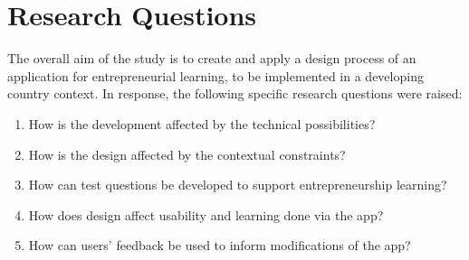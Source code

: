 \section{Research Questions}\label{sec:research-questions}

The overall aim of the study is to create and apply a design process of an application for entrepreneurial learning, to be implemented in a developing country context. In response, the following specific research questions were raised:

\begin{enumerate}
    \item How is the development affected by the technical possibilities?

    \item How is the design affected by the contextual  constraints? %


    \item How can test questions be developed to support entrepreneurship learning? %

    \item How does design affect usability and learning done via the app? %

    \item How can users' feedback be used to inform modifications of the app?

\end{enumerate}




